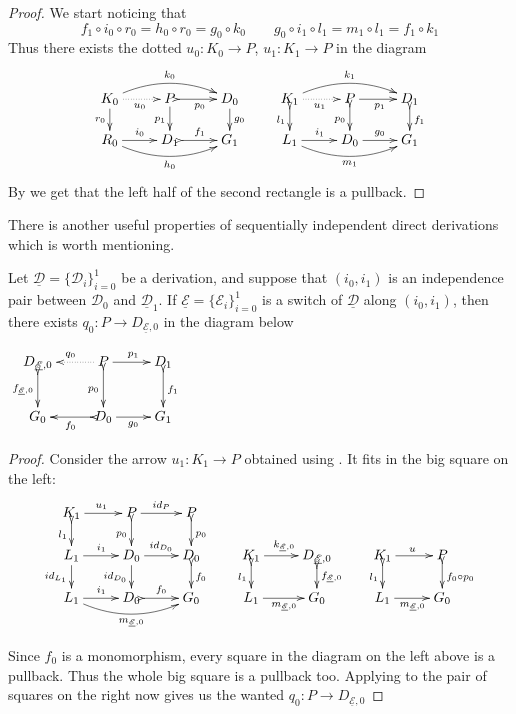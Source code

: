 \documentclass[a4paper,UKenglish,cleveref,pdftex,thm-restate,numberwithinsect,anonymous]{lipics}
\newcommand{\id}[1]{\mathsf{id}_{#1}}
\def\R{\mathsf{R}}
\newcommand{\dder}[1]{\mathscr{#1}}
\newcommand{\der}[1]{\underline{\dder{#1}}}
\begin{document}
\begin{proof}
	We start noticing that
	\[
	f_1\circ i_0\circ r_0=h_0\circ r_0=g_0\circ k_0 \qquad
	g_0\circ i_1\circ l_1=m_1\circ l_1= f_1 \circ k_1
	\]
	Thus there exists the dotted $u_0\colon K_0\to P$,
	$u_1\colon K_1\to P$ in the diagram
	\[\xymatrix@R=15pt{K_0 \ar[d]_{r_0}
		\ar@{.>}[r]_{u_0}\ar@/^.4cm/[rr]^{k_0} &P
		\ar@{>->}[r]_{p_0} \ar[d]_{p_1}& D_0 \ar[d]^{g_0}&K_1
		\ar@{>->}[d]_{l_1}
		\ar@{.>}[r]_{u_1}\ar@/^.4cm/[rr]^{k_1} &P \ar[r]_{p_1}
		\ar@{>->}[d]_{p_0}& D_1 \ar@{>->}[d]^{f_1}\\R_0
		\ar@/_.4cm/[rr]_{h_0}\ar[r]^{i_0}& D_1
		\ar@{>->}[r]^{f_1}& G_1&L_1
		\ar@/_.4cm/[rr]_{m_1}\ar[r]^{i_1}& D_0 \ar[r]^{g_0}&
		G_1}\]
	By  we get that the left half of
	the second rectangle is a pullback.
	\qedhere
\end{proof}

There is another
useful properties of  sequentially independent direct
derivations which is worth mentioning.

\noindent
\parbox{9.5cm}
{\begin{proposition}\label{lem:cose}Let
    $\der{D}=\{\dder{D}_i\}_{i=0}^1$ be a derivation, and suppose
    that $(i_0, i_1)$ is an independence pair between $\dder{D}_0$
    and $\der{D}_1$.  If $\der{E}=\{\dder{E}_i\}_{i=0}^1$ is a
    switch of $\der{D}$ along $(i_0, i_1)$, then there exists
    $q_0\colon P\to D_{\der{E},0}$ in the diagram
    below \end{proposition}}
\parbox{4cm}{$\xymatrix{D_{\der{E},0} \ar@{>->}[d]_{f_{\der{E},0}}&P
    \ar@{.>}[l]_{q_0} \ar[r]^{p_1} \ar@{>->}[d]_{p_0}& D_1
    \ar@{>->}[d]^{f_1}\\ G_{0}&D_0 \ar@{>->}[l]^{f_0}\ar[r]_{g_0}&
    G_1}$}

\begin{proof}
  Consider the arrow $u_1\colon K_1\to P$ obtained using
  . It fits in the big square on the left:
\[		\xymatrix@R=15pt{K_1 \ar[r]^{u_1} \ar@{>->}[d]_{l_1}&P
	\ar[r]^{\id{P}}\ar@{>->}[d]_{p_0}& P\ar@{>->}[d]^{p_0}\\L_1
	\ar[d]_{\id{L_1}}\ar[r]^{i_1}&D_0 \ar[r]^{\id{D_0}}
	\ar[d]_{\id{D_0}}& D_{0} \ar@{>->}[d]^{f_0}&K_1 \ar@{>->}[d]_{l_1}\ar[r]^{k_{\der{E},0}}&
	D_{\der{E},0} \ar@{>->}[d]^{f_{\der{E},0}} & K_1 \ar[r]^{u}
	\ar@{>->}[d]_{l_1}& P \ar@{>->}[d]^{f_0\circ
		p_0}\\
	L_1\ar[r]^{i_1} \ar@/_.4cm/[rr]_{m_{\der{E},0}}&D_0
	\ar@{>->}[r]^{f_0}&G_0 & L_1\ar[r]_{m_{\der{E},0}}&G_0 &L_1
	\ar[r]_{m_{\der{E},0}}&G_0}\]

  	Since $f_0$ is a monomorphism, every square in the diagram on the left above
  	is a pullback. Thus the whole big square is a pullback too.
  	Applying  to the pair of squares on the right now gives
  	us the wanted $q_0\colon P\to D_{\der{E},0}$
  
\end{proof}
\end{document}

